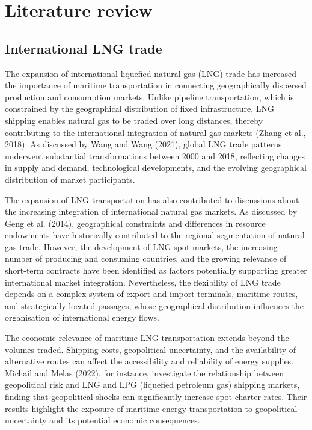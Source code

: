 \documentclass[pdftex,12pt,openright,a4paper,oneside]{book}
\begin{document}
% 
% 
\chapter{Literature review}
\label{chap:soa}

\section{International LNG trade}
\label{sec:literature_lng_trade}

The expansion of international liquefied natural gas (LNG) trade has increased the importance of maritime transportation in connecting geographically dispersed production and consumption markets. Unlike pipeline transportation, which is constrained by the geographical distribution of fixed infrastructure, LNG shipping enables natural gas to be traded over long distances, thereby contributing to the international integration of natural gas markets (Zhang et al., 2018). As discussed by Wang and Wang (2021), global LNG trade patterns underwent substantial transformations between 2000 and 2018, reflecting changes in supply and demand, technological developments, and the evolving geographical distribution of market participants.

The expansion of LNG transportation has also contributed to discussions about the increasing integration of international natural gas markets. As discussed by Geng et al. (2014), geographical constraints and differences in resource endowments have historically contributed to the regional segmentation of natural gas trade. However, the development of LNG spot markets, the increasing number of producing and consuming countries, and the growing relevance of short-term contracts have been identified as factors potentially supporting greater international market integration. Nevertheless, the flexibility of LNG trade depends on a complex system of export and import terminals, maritime routes, and strategically located passages, whose geographical distribution influences the organisation of international energy flows.

The economic relevance of maritime LNG transportation extends beyond the volumes traded. Shipping costs, geopolitical uncertainty, and the availability of alternative routes can affect the accessibility and reliability of energy supplies. Michail and Melas (2022), for instance, investigate the relationship between geopolitical risk and LNG and LPG (liquefied petroleum gas) shipping markets, finding that geopolitical shocks can significantly increase spot charter rates. Their results highlight the exposure of maritime energy transportation to geopolitical uncertainty and its potential economic consequences.
\end{document}

